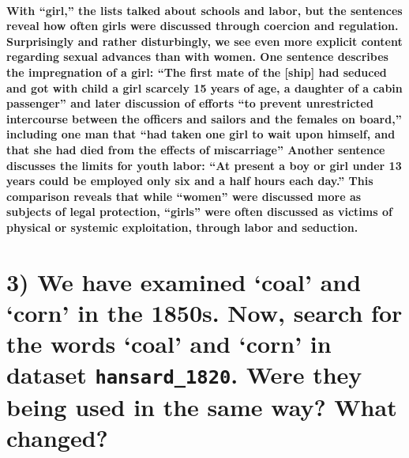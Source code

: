 \documentclass[
]{article}
\begin{document}
\paragraph{With ``girl,'' the lists talked about schools and labor, but
the sentences reveal how often girls were discussed through coercion and
regulation. Surprisingly and rather disturbingly, we see even more
explicit content regarding sexual advances than with women. One sentence
describes the impregnation of a girl: ``The first mate of the {[}ship{]}
had seduced and got with child a girl scarcely 15 years of age, a
daughter of a cabin passenger'' and later discussion of efforts ``to
prevent unrestricted intercourse between the officers and sailors and
the females on board,'' including one man that ``had taken one girl to
wait upon himself, and that she had died from the effects of
miscarriage'' Another sentence discusses the limits for youth labor:
``At present a boy or girl under 13 years could be employed only six and
a half hours each day.'' This comparison reveals that while ``women''
were discussed more as subjects of legal protection, ``girls'' were
often discussed as victims of physical or systemic exploitation, through
labor and
seduction.}\label{with-girl-the-lists-talked-about-schools-and-labor-but-the-sentences-reveal-how-often-girls-were-discussed-through-coercion-and-regulation.-surprisingly-and-rather-disturbingly-we-see-even-more-explicit-content-regarding-sexual-advances-than-with-women.-one-sentence-describes-the-impregnation-of-a-girl-the-first-mate-of-the-ship-had-seduced-and-got-with-child-a-girl-scarcely-15-years-of-age-a-daughter-of-a-cabin-passenger-and-later-discussion-of-efforts-to-prevent-unrestricted-intercourse-between-the-officers-and-sailors-and-the-females-on-board-including-one-man-that-had-taken-one-girl-to-wait-upon-himself-and-that-she-had-died-from-the-effects-of-miscarriage-another-sentence-discusses-the-limits-for-youth-labor-at-present-a-boy-or-girl-under-13-years-could-be-employed-only-six-and-a-half-hours-each-day.-this-comparison-reveals-that-while-women-were-discussed-more-as-subjects-of-legal-protection-girls-were-often-discussed-as-victims-of-physical-or-systemic-exploitation-through-labor-and-seduction.}

\section{\texorpdfstring{3) We have examined `coal' and `corn' in the
1850s. Now, search for the words `coal' and `corn' in dataset
\texttt{hansard\_1820}. Were they being used in the same way? What
changed?}{3) We have examined `coal' and `corn' in the 1850s. Now, search for the words `coal' and `corn' in dataset hansard\_1820. Were they being used in the same way? What changed?}}\label{we-have-examined-coal-and-corn-in-the-1850s.-now-search-for-the-words-coal-and-corn-in-dataset-hansard_1820.-were-they-being-used-in-the-same-way-what-changed}
\end{document}
